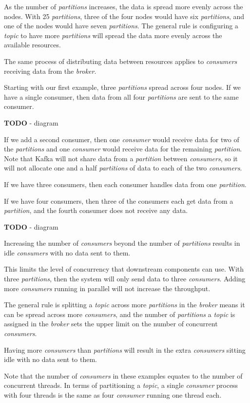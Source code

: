 \documentclass{article}
\newcommand{\kafka} {Kafka\xspace}
\newcommand{\kftopic} {\textit{topic}\xspace}
\newcommand{\kfbroker} {\textit{broker}\xspace}
\newcommand{\kfconsumer} {\textit{consumer}\xspace}
\newcommand{\kfconsumers} {\textit{consumers}\xspace}
\newcommand{\kfpartition} {\textit{partition}\xspace}
\newcommand{\kfpartitions} {\textit{partitions}\xspace}
\begin{document}
As the number of \kfpartitions increases, the data is spread more evenly across the nodes.
With 25 \kfpartitions, three of the four nodes would have six
\kfpartitions, and one of the nodes would have seven \kfpartitions.
The general rule is configuring a \kftopic to have more \kfpartitions will spread the data more evenly across the available resources.

The same process of distributing data between resources applies to \kfconsumers receiving data from the \kfbroker.

Starting with our first example, three \kfpartitions spread across four nodes. If we have a single consumer, then data from all four \kfpartitions are sent to the same consumer.

\textbf{TODO} - diagram

If we add a second consumer, then one \kfconsumer would receive data for two of the \kfpartitions and one \kfconsumer would receive data for the remaining \kfpartition.
Note that \kafka will not share data from a \kfpartition between \kfconsumers, so it will not allocate one and a half \kfpartitions of data to each of the two \kfconsumers.

If we have three consumers, then each consumer handles data from one \kfpartition.

If we have four consumers, then three of the consumers each get data from a \kfpartition, and the fourth consumer does not receive any data.

\textbf{TODO} - diagram

Increasing the number of \kfconsumers beyond the number of \kfpartitions results in idle \kfconsumers with no data sent to them.

This limits the level of concurrency that downstream components can use. With three \kfpartitions, then the system will only send data to three \kfconsumers.
Adding more \kfconsumers running in parallel will not increase the throughput.

The general rule is splitting a \kftopic across more \kfpartitions in the \kfbroker means it can be spread across more \kfconsumers, and the number of \kfpartitions a \kftopic is assigned in the \kfbroker sets the upper limit on the number of concurrent \kfconsumers.

Having more \kfconsumers than \kfpartitions will result in the extra \kfconsumers sitting idle with no data sent to them.

Note that the number of \kfconsumers in these examples equates to the number of concurrent threads. In terms of partitioning a \kftopic, a single \kfconsumer process with four threads is the same as
four \kfconsumer running one thread each.
\end{document}
